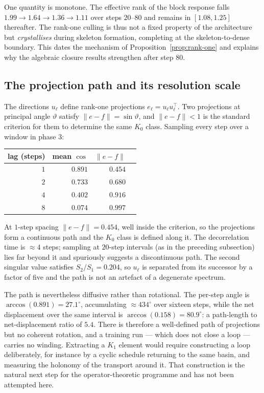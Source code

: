 One quantity is monotone. The effective rank of the block response falls
$1.99 \to 1.64 \to 1.36 \to 1.11$ over steps $20$--$80$ and remains in
$[1.08, 1.25]$ thereafter. The rank-one culling is thus not a fixed property of
the architecture but \emph{crystallises} during skeleton formation, completing
at the skeleton-to-dense boundary. This dates the mechanism of
Proposition~\ref{prop:rank-one} and explains why the algebraic closure results
strengthen after step $80$.

\subsection{The projection path and its resolution scale}

The directions $u_\ell$ define rank-one projections $e_\ell = u_\ell u_\ell^{\!\top}$.
Two projections at principal angle $\vartheta$ satisfy
$\|e-f\| = \sin\vartheta$, and $\|e-f\| < 1$ is the standard criterion for
them to determine the same $K_0$ class. Sampling every step over a window in
phase 3:

\begin{center}
\begin{tabular}{rrrr}
\toprule
lag (steps) & mean $\cos$ & $\|e-f\|$ & \\
\midrule
$1$  & $0.891$ & $0.454$ \\
$2$  & $0.733$ & $0.680$ \\
$4$  & $0.402$ & $0.916$ \\
$8$  & $0.074$ & $0.997$ \\
\bottomrule
\end{tabular}
\end{center}

\begin{observation}
At $1$-step spacing $\|e-f\| = 0.454$, well inside the criterion, so the
projections form a continuous path and the $K_0$ class is defined along it.
The decorrelation time is $\approx 4$ steps; sampling at $20$-step intervals
(as in the preceding subsection) lies far beyond it and spuriously suggests a
discontinuous path. The second singular value satisfies $S_2/S_1 = 0.204$, so
$u_\ell$ is separated from its successor by a factor of five and the path is
not an artefact of a degenerate spectrum.
\end{observation}

The path is nevertheless diffusive rather than rotational. The per-step angle
is $\arccos(0.891) = 27.1^\circ$, accumulating $\approx 434^\circ$ over sixteen
steps, while the net displacement over the same interval is
$\arccos(0.158) = 80.9^\circ$: a path-length to net-displacement ratio of
$5.4$. There is therefore a well-defined path of projections but no coherent
rotation, and a training run --- which does not close a loop --- carries no
winding. Extracting a $K_1$ element would require constructing a loop
deliberately, for instance by a cyclic schedule returning to the same basin,
and measuring the holonomy of the transport around it. That construction is
the natural next step for the operator-theoretic programme and has not been
attempted here.

